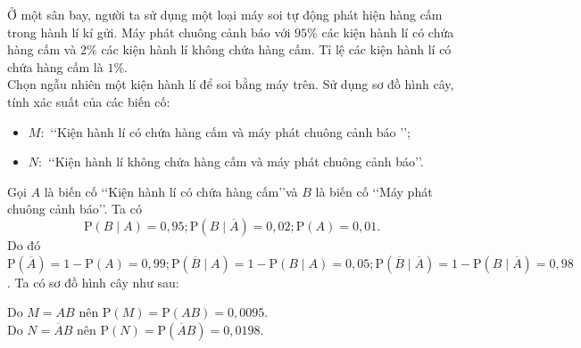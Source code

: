 \begin{vd}%
	Ở một sân bay, người ta sử dụng một loại máy soi tự động phát hiện hàng cấm trong hành lí kí gửi. Máy phát chuông cảnh báo với $95 \%$ các kiện hành lí có chứa hàng cấm và $2 \%$ các kiện hành lí không chứa hàng cấm. Tỉ lệ các kiện hành lí có chứa hàng cấm là $1 \%$.\\
	Chọn ngẫu nhiên một kiện hành lí để soi bằng máy trên. Sử dụng sơ đồ hình cây, tính xác suất của các biến cố:
	\begin{itemize}
		\item $ M: $ \lq\lq Kiện hành lí có chứa hàng cấm và máy phát chuông cảnh báo \rq\rq;
		\item $ N: $ \lq\lq Kiện hành lí không chứa hàng cấm và máy phát chuông cảnh báo\rq\rq.
	\end{itemize}
	\loigiai
	{
		Gọi $A$ là biến cố \lq\lq Kiện hành lí có chứa hàng cấm\rq\rq và $B$ là biến cố \lq\lq Máy phát chuông cảnh báo\rq\rq. Ta có
		$$
		\mathrm{P}(B \mid A)=0{,}95 ; \mathrm{P}(B \mid \overline{A})=0{,}02 ; \mathrm{P}(A)=0{,}01.
		$$
		Do đó $\mathrm{P}(\overline{A})=1-\mathrm{P}(A)=0{,}99 ; \mathrm{P}(\overline{B} \mid A)=1-\mathrm{P}(B \mid A)=0{,}05 ; \mathrm{P}(\overline{B} \mid \overline{A})=1-\mathrm{P}(B \mid \overline{A})=0{,}98$.
		Ta có sơ đồ hình cây như sau:
		\begin{center}
		\end{center}
		Do $M=A B$ nên $\mathrm{P}(M)=\mathrm{P}(A B)=0{,}0095$.\\
		Do $N=\overline{A} B$ nên $\mathrm{P}(N)=\mathrm{P}(\overline{A} B)=0{,}0198$.
	}
\end{vd}



